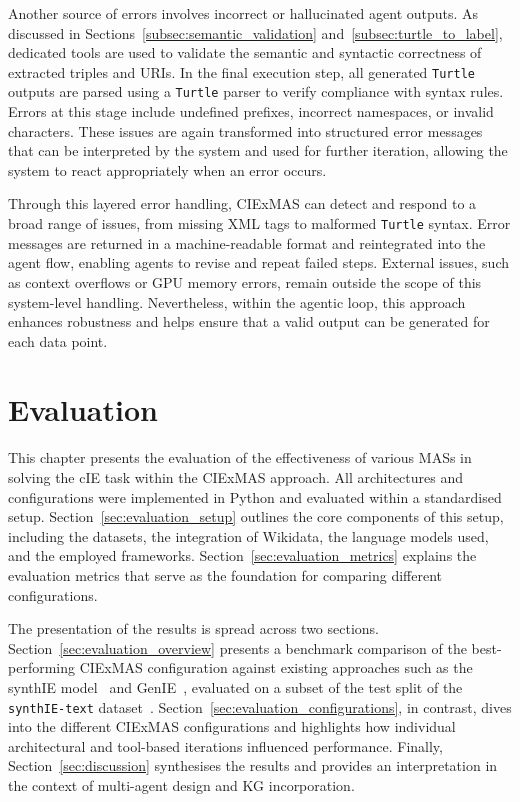 \documentclass[a4paper,oneside,bibliography=totoc]{scrbook}
\begin{document}
Another source of errors involves incorrect or hallucinated agent outputs. As discussed in Sections~\ref{subsec:semantic_validation} and~\ref{subsec:turtle_to_label}, dedicated tools are used to validate the semantic and syntactic correctness of extracted triples and \acp{URI}. In the final execution step, all generated \texttt{Turtle} outputs are parsed using a \texttt{Turtle} parser to verify compliance with syntax rules. Errors at this stage include undefined prefixes, incorrect namespaces, or invalid characters. These issues are again transformed into structured error messages that can be interpreted by the system and used for further iteration, allowing the system to react appropriately when an error occurs.

Through this layered error handling, CIExMAS can detect and respond to a broad range of issues, from missing \ac{XML} tags to malformed \texttt{Turtle} syntax. Error messages are returned in a machine-readable format and reintegrated into the agent flow, enabling agents to revise and repeat failed steps. External issues, such as context overflows or GPU memory errors, remain outside the scope of this system-level handling. Nevertheless, within the agentic loop, this approach enhances robustness and helps ensure that a valid output can be generated for each data point.

\chapter{Evaluation}
\label{ch:evaluation}

This chapter presents the evaluation of the effectiveness of various \acp{MAS} in solving the \ac{cIE} task within the CIExMAS approach. All architectures and configurations were implemented in Python and evaluated within a standardised setup. Section~\ref{sec:evaluation_setup} outlines the core components of this setup, including the datasets, the integration of Wikidata, the language models used, and the employed frameworks. Section~\ref{sec:evaluation_metrics} explains the evaluation metrics that serve as the foundation for comparing different configurations.

The presentation of the results is spread across two sections. Section~\ref{sec:evaluation_overview} presents a benchmark comparison of the best-performing CIExMAS configuration against existing approaches such as the synthIE model~\cite{Josifoski2023} and GenIE~\cite{Josifoski2021}, evaluated on a subset of the test split of the \texttt{synthIE-text} dataset~\cite{Josifoski2023}. Section~\ref{sec:evaluation_configurations}, in contrast, dives into the different CIExMAS configurations and highlights how individual architectural and tool-based iterations influenced performance. Finally, Section~\ref{sec:discussion} synthesises the results and provides an interpretation in the context of multi-agent design and \ac{KG} incorporation.
\end{document}
